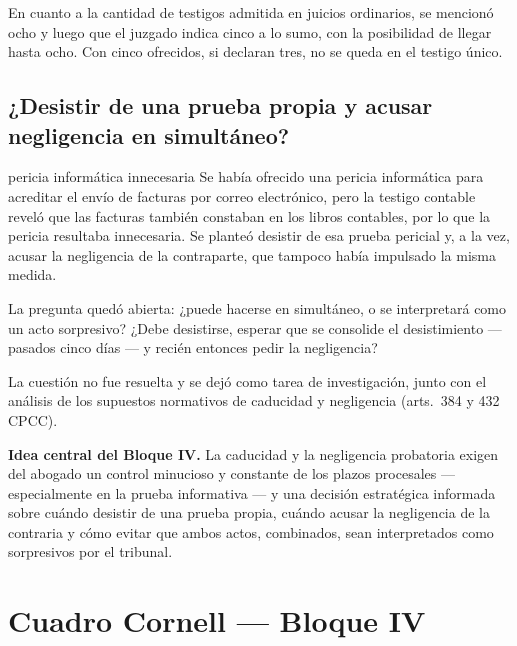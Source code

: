 \documentclass[12pt,oneside]{book}
\begin{document}
En cuanto a la cantidad de testigos admitida en juicios ordinarios, se mencionó ocho y luego que el juzgado indica cinco a lo sumo, con la posibilidad de llegar hasta ocho. Con cinco ofrecidos, si declaran tres, no se queda en el testigo único.

\subsection{¿Desistir de una prueba propia y acusar negligencia en simultáneo?}

\begin{example}{pericia informática innecesaria}
Se había ofrecido una pericia informática para acreditar el envío de facturas por correo electrónico, pero la testigo contable reveló que las facturas también constaban en los libros contables, por lo que la pericia resultaba innecesaria. Se planteó desistir de esa prueba pericial y, a la vez, acusar la negligencia de la contraparte, que tampoco había impulsado la misma medida.

La pregunta quedó abierta: ¿puede hacerse en simultáneo, o se interpretará como un acto sorpresivo? ¿Debe desistirse, esperar que se consolide el desistimiento --- pasados cinco días --- y recién entonces pedir la negligencia?
\end{example}

La cuestión no fue resuelta y se dejó como tarea de investigación, junto con el análisis de los supuestos normativos de caducidad y negligencia (arts.\ 384 y 432 CPCC).

\begin{important}
\textbf{Idea central del Bloque IV.} La caducidad y la negligencia probatoria exigen del abogado un control minucioso y constante de los plazos procesales --- especialmente en la prueba informativa --- y una decisión estratégica informada sobre cuándo desistir de una prueba propia, cuándo acusar la negligencia de la contraria y cómo evitar que ambos actos, combinados, sean interpretados como sorpresivos por el tribunal.
\end{important}

\section{Cuadro Cornell --- Bloque IV}
\end{document}

